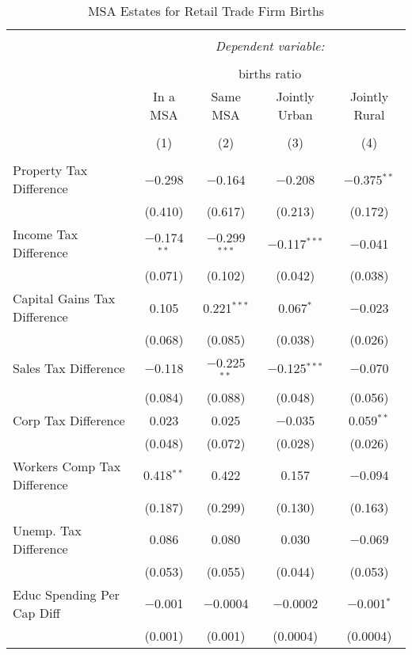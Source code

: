 
\begin{table}[!htbp] \centering 
  \caption{MSA Estates for  Retail Trade Firm Births} 
  \label{} 
\begin{tabular}{@{\extracolsep{5pt}}lcccc} 
\\[-1.8ex]\hline 
\hline \\[-1.8ex] 
 & \multicolumn{4}{c}{\textit{Dependent variable:}} \\ 
\cline{2-5} 
\\[-1.8ex] & \multicolumn{4}{c}{births ratio} \\ 
 & In a MSA & Same MSA & Jointly Urban & Jointly Rural \\ 
\\[-1.8ex] & (1) & (2) & (3) & (4)\\ 
\hline \\[-1.8ex] 
 Property Tax Difference & $-$0.298 & $-$0.164 & $-$0.208 & $-$0.375$^{**}$ \\ 
  & (0.410) & (0.617) & (0.213) & (0.172) \\ 
  Income Tax Difference & $-$0.174$^{**}$ & $-$0.299$^{***}$ & $-$0.117$^{***}$ & $-$0.041 \\ 
  & (0.071) & (0.102) & (0.042) & (0.038) \\ 
  Capital Gains Tax Difference & 0.105 & 0.221$^{***}$ & 0.067$^{*}$ & $-$0.023 \\ 
  & (0.068) & (0.085) & (0.038) & (0.026) \\ 
  Sales Tax Difference & $-$0.118 & $-$0.225$^{**}$ & $-$0.125$^{***}$ & $-$0.070 \\ 
  & (0.084) & (0.088) & (0.048) & (0.056) \\ 
  Corp Tax Difference & 0.023 & 0.025 & $-$0.035 & 0.059$^{**}$ \\ 
  & (0.048) & (0.072) & (0.028) & (0.026) \\ 
  Workers Comp Tax Difference & 0.418$^{**}$ & 0.422 & 0.157 & $-$0.094 \\ 
  & (0.187) & (0.299) & (0.130) & (0.163) \\ 
  Unemp. Tax Difference & 0.086 & 0.080 & 0.030 & $-$0.069 \\ 
  & (0.053) & (0.055) & (0.044) & (0.053) \\ 
  Educ Spending Per Cap Diff & $-$0.001 & $-$0.0004 & $-$0.0002 & $-$0.001$^{*}$ \\ 
  & (0.001) & (0.001) & (0.0004) & (0.0004) \\ 

\end{tabular}
\end{table}
